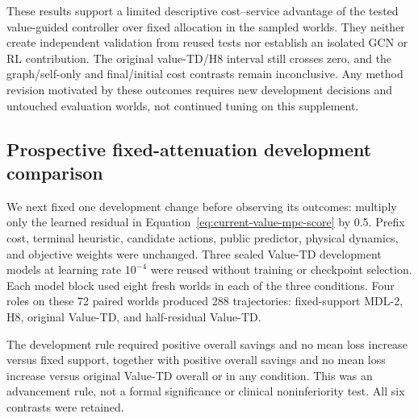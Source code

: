 \documentclass[preprint,review,12pt]{elsarticle}
\begin{document}
These results support a limited descriptive cost--service advantage of the
tested value-guided controller over fixed allocation in the sampled worlds.
They neither create independent validation from reused tests nor establish
an isolated GCN or RL contribution. The original value-TD/H8 interval still
crosses zero, and the graph/self-only and final/initial cost contrasts remain
inconclusive. Any method revision motivated by these outcomes requires new
development decisions and untouched evaluation worlds, not continued tuning
on this supplement.

\subsection{Prospective fixed-attenuation development comparison}
\label{sec:attenuation-development}
We next fixed one development change before observing its outcomes:
multiply only the learned residual in Equation~\ref{eq:current-value-mpc-score}
by 0.5. Prefix cost, terminal heuristic, candidate actions, public predictor,
physical dynamics, and objective weights were unchanged. Three sealed
Value-TD development models at learning rate $10^{-4}$ were reused without
training or checkpoint selection. Each model block used eight fresh worlds
in each of the three conditions. Four roles on these 72 paired worlds
produced 288 trajectories: fixed-support MDL-2, H8, original Value-TD,
and half-residual Value-TD.

The development rule required positive overall savings and no mean loss
increase versus fixed support, together with positive overall savings and
no mean loss increase versus original Value-TD overall or in any condition.
This was an advancement rule, not a formal significance or clinical
noninferiority test. All six contrasts were retained.
\end{document}
